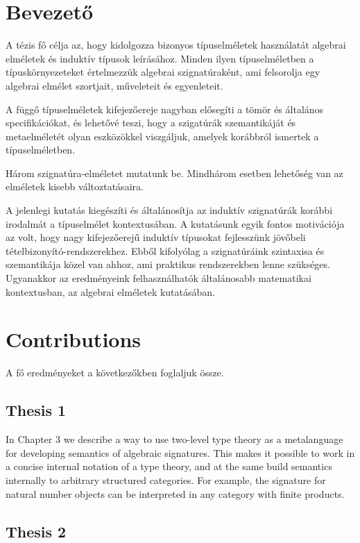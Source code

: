 \documentclass[12pt]{article}
\begin{document}
\section{Bevezető}

A tézis fő célja az, hogy kidolgozza bizonyos típuselméletek használatát
algebrai elméletek és induktív típusok leírásához. Minden ilyen típuselméletben
a típuskörnyezeteket értelmezzük algebrai szignatúraként, ami felsorolja
egy algebrai elmélet szortjait, műveleteit és egyenleteit.

A függő típuselméletek kifejezőereje nagyban elősegíti a tömör és általános
specifikációkat, és lehetővé teszi, hogy a szigatúrák szemantikáját és
metaelméletét olyan eszközökkel viszgáljuk, amelyek korábbról ismertek a
típuselméletben.

Három szignatúra-elméletet mutatunk be. Mindhárom esetben lehetőség van az
elméletek kisebb változtatásaira.

A jelenlegi kutatás kiegészíti és általánosítja az induktív szignatúrák korábbi
irodalmát a típuselmélet kontextusában. A kutatásunk egyik fontos motivációja az
volt, hogy nagy kifejezőerejű induktív típusokat fejlesszünk jövőbeli
tételbizonyító-rendszerekhez. Ebből kifolyólag a szignatúráink szintaxisa és
szemantikája közel van ahhoz, ami praktikus rendszerekben lenne
szükséges. Ugyanakkor az eredményeink felhasználhatók általánosabb matematikai
kontextusban, az algebrai elméletek kutatásában.

\section{Contributions}

A fő eredményeket a következőkben foglaljuk össze.

\subsection*{Thesis 1}

In Chapter 3 we describe a way to use two-level type theory \cite{twolevel} as a
metalanguage for developing semantics of algebraic signatures. This makes it
possible to work in a concise internal notation of a type theory, and at the
same build semantics internally to arbitrary structured categories. For example,
the signature for natural number objects can be interpreted in any category with
finite products.

\subsection*{Thesis 2}
\end{document}
